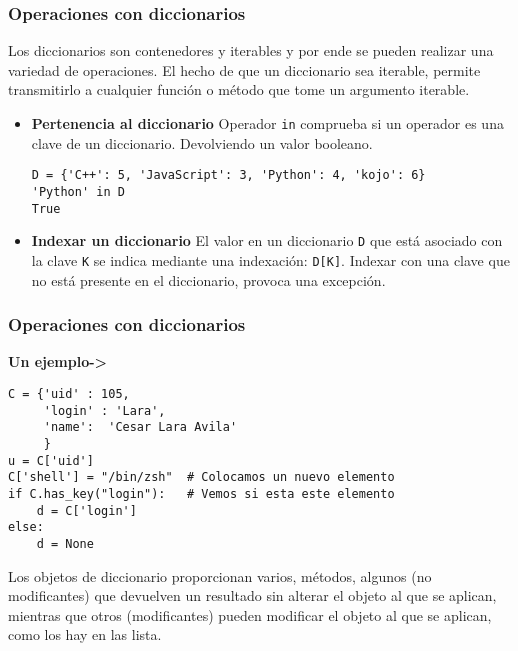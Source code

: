 \documentclass[10pt]{beamer}
\begin{document}
\begin{frame}[fragile]
\frametitle{Operaciones con diccionarios}

Los diccionarios son contenedores y iterables y por ende  se pueden realizar una variedad de operaciones. El hecho de que un diccionario sea iterable, permite transmitirlo a cualquier funci\'on o m\'etodo que tome un argumento iterable.

\vspace{0.2cm}


\begin{itemize}
\item \textbf{Pertenencia al diccionario} Operador \texttt{in} comprueba si un operador es una clave de un diccionario. Devolviendo un valor booleano.

\vspace{0.2cm}

\begin{lstlisting}
D = {'C++': 5, 'JavaScript': 3, 'Python': 4, 'kojo': 6}
'Python' in D
True 
\end{lstlisting}
\item \textbf{Indexar un diccionario} El valor en un diccionario \texttt{D} que est\'a asociado con la clave \texttt{K} se indica mediante una indexaci\'on: \texttt{D[K]}. Indexar con una clave que no est\'a presente en el diccionario, provoca una excepci\'on.
\end{itemize}
\end{frame}


\begin{frame}[fragile]
\frametitle{Operaciones con diccionarios}

\vspace{0.2cm}

\textbf{Un ejemplo->}

\vspace{0.2cm}


\begin{lstlisting}
C = {'uid' : 105,
	 'login' : 'Lara',
	 'name':  'Cesar Lara Avila'
	 }
u = C['uid']              
C['shell'] = "/bin/zsh"  # Colocamos un nuevo elemento
if C.has_key("login"):   # Vemos si esta este elemento
    d = C['login']      
else:
    d = None
\end{lstlisting}


\vspace{0.2cm}


Los objetos de diccionario proporcionan varios, m\'etodos, algunos (no modificantes) que devuelven un resultado sin alterar el objeto al que se aplican, mientras que otros (modificantes) pueden modificar el objeto al que se aplican, como los hay en las lista. 

\end{frame}
\end{document}
